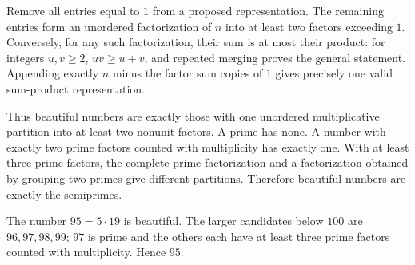Remove all entries equal to $1$ from a proposed representation. The remaining entries form an unordered factorization of $n$ into at least two factors exceeding $1$. Conversely, for any such factorization, their sum is at most their product: for integers $u,v\ge2$, $uv\ge u+v$, and repeated merging proves the general statement. Appending exactly $n$ minus the factor sum copies of $1$ gives precisely one valid sum-product representation.

Thus beautiful numbers are exactly those with one unordered multiplicative partition into at least two nonunit factors. A prime has none. A number with exactly two prime factors counted with multiplicity has exactly one. With at least three prime factors, the complete prime factorization and a factorization obtained by grouping two primes give different partitions. Therefore beautiful numbers are exactly the semiprimes.

The number $95=5\cdot19$ is beautiful. The larger candidates below $100$ are $96,97,98,99$; $97$ is prime and the others each have at least three prime factors counted with multiplicity. Hence $\boxed{95}$.
